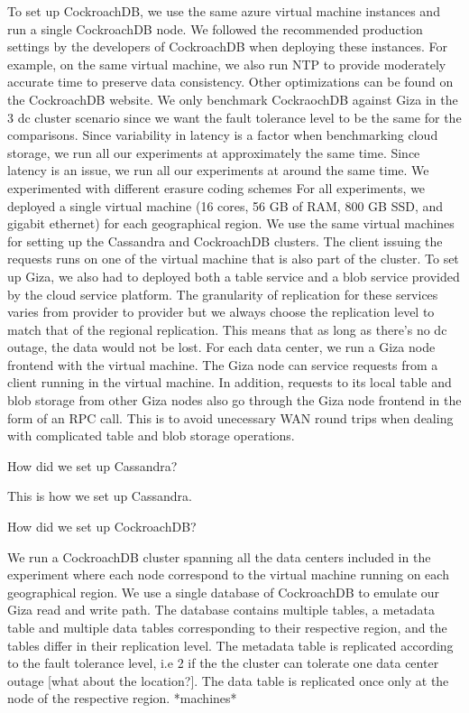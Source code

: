 To set up CockroachDB, we use the same azure virtual machine instances and run a single CockroachDB node. We followed the recommended production settings by the developers of CockroachDB when deploying these instances. For example, on the same virtual machine, we also run NTP to provide moderately accurate time to preserve data consistency. Other optimizations can be found on the CockroachDB website. We only benchmark CockraochDB against Giza in the 3 dc cluster scenario since we want the fault tolerance level to be the same for the comparisons.
Since variability in latency is a factor when benchmarking cloud storage, we run all our experiments at approximately the same time.
Since latency is an issue, we run all our experiments at around the same time.
We experimented with different erasure coding schemes
For all experiments, we deployed a single virtual machine (16 cores, 56 GB of RAM, 800 GB SSD, and gigabit ethernet) for each geographical region. We use the same virtual machines for setting up the Cassandra and CockroachDB clusters. The client issuing the requests runs on one of the virtual machine that is also part of the cluster. 
To set up Giza, we also had to deployed both a table service and a blob service provided by the cloud service platform. The granularity of replication for these services varies from provider to provider but we always choose the replication level to match that of the regional replication. This means that as long as there’s no dc outage, the data would not be lost. For each data center, we run a Giza node frontend with the virtual machine. The Giza node can service requests from a client running in the virtual machine. In addition, requests to its local table and blob storage from other Giza nodes also go through the Giza node frontend in the form of an RPC call. This is to avoid unecessary WAN round trips when dealing with complicated table and blob storage operations. 

How did we set up Cassandra?

This is how we set up Cassandra.

How did we set up CockroachDB?

We run a CockroachDB cluster spanning all the data centers included in the experiment where each node correspond to the virtual machine running on each geographical region. We use a single database of CockroachDB to emulate our Giza read and write path. The database contains multiple tables, a metadata table and multiple data tables corresponding to their respective region, and the tables differ in their replication level. The metadata table is replicated according to the fault tolerance level, i.e 2 if the the cluster can tolerate one data center outage [what about the location?]. The data table is replicated once only at the node of the respective region.
*machines*

